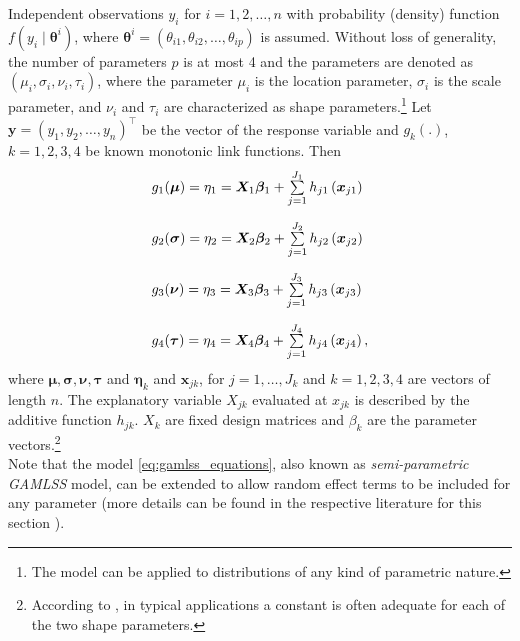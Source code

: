 Independent observations $y_i$ for $i=1,2,\ldots,n$ with probability (density) function $f\left(y_{i} \mid \boldsymbol{\theta}^{i}\right)$, where $\boldsymbol{\theta}^{i}=\left(\theta_{i 1}, \theta_{i 2}, \ldots, \theta_{i p}\right)$ is assumed. Without loss of generality, the number of parameters $p$ is at most 4 and the parameters are denoted as $\left(\mu_{i}, \sigma_{i}, \nu_{i}, \tau_{i}\right)$, where the parameter $\mu_i$ is the location parameter, $\sigma_i$ is the scale parameter, and $\nu_i$ and $\tau_i$ are characterized as shape parameters.\footnote{The model can be applied to distributions of any kind of parametric nature.} Let $\mathbf{y}=\left(y_{1}, y_{2}, \ldots, y_{n}\right)^{\top}$ be the vector of the response variable and $g_k(.)$, $k = 1,2,3,4$ be known monotonic link functions. Then 
\begin{equation}
\begin{array}{l}
g_{1}(\boldsymbol{\mu})=\eta_{1}=\mathbf{X}_{1} \boldsymbol{\beta}_{1}+\sum\limits_{j=1}^{J_{1}} h_{j 1}\left(\mathbf{x}_{j 1}\right) \\ \noalign{\vskip10pt}
g_{2}(\boldsymbol{\sigma})=\eta_{2}=\mathbf{X}_{2} \boldsymbol{\beta}_{2}+\sum\limits_{j=1}^{J_{2}} h_{j 2}\left(\mathbf{x}_{j 2}\right) \\ \noalign{\vskip10pt}
g_{3}(\boldsymbol{\nu})=\eta_{3}=\mathbf{X}_{3} \boldsymbol{\beta}_{3}+\sum\limits_{j=1}^{J_{3}} h_{j 3}\left(\mathbf{x}_{j 3}\right) \\ \noalign{\vskip10pt}
g_{4}(\boldsymbol{\tau})=\eta_{4}=\mathbf{X}_{4} \boldsymbol{\beta}_{4}+\sum\limits_{j=1}^{J_{4}} h_{j 4}\left(\mathbf{x}_{j 4}\right),
\end{array}
\label{eq:gamlss_equations}
\end{equation}
where $\bm{\mu}, \bm{\sigma}, \bm{\nu}, \bm{\tau}$ and $\bm{\eta}_k$ and $\bm{x}_{jk}$, for $j=1,\ldots,J_k$ and $k=1,2,3,4$ are vectors of length $n$. The explanatory variable $X_{jk}$ evaluated at $x_{jk}$ is described by the additive function $h_{jk}$. $X_k$ are fixed design matrices and $\beta_k$ are the parameter vectors.\footnote{According to \cite{stasinopoulos2007generalized}, in typical applications a constant is often adequate for each of the two shape parameters.}
\\
Note that the model \ref{eq:gamlss_equations}, also known as \textit{semi-parametric \ac{GAMLSS}} model, can be extended to allow random effect terms to be included for any parameter (more details can be found in the respective literature for this section \citep{rigby2001gamlss, rigby2005generalized}).














